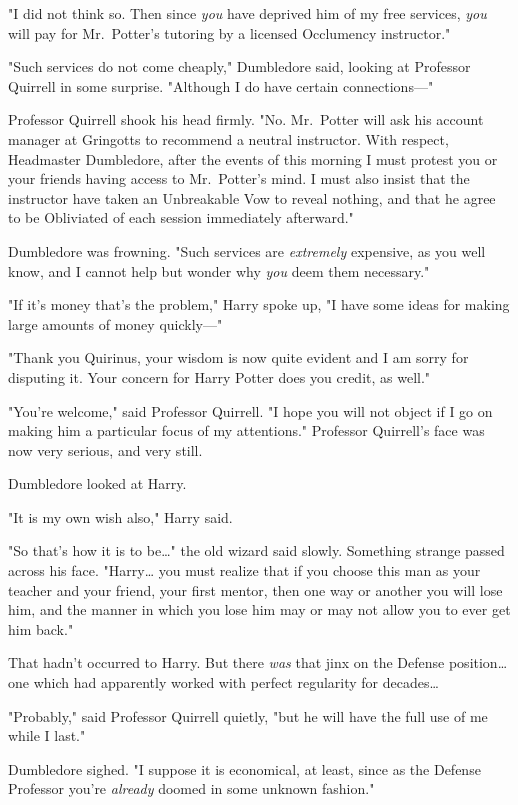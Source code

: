 "I did not think so. Then since \emph{you} have deprived him of my free 
services, \emph{you} will pay for Mr.~Potter's tutoring by a licensed 
Occlumency instructor."

"Such services do not come cheaply," Dumbledore said, looking at Professor 
Quirrell in some surprise. "Although I do have certain connections---"

Professor Quirrell shook his head firmly. "No. Mr.~Potter will ask his account 
manager at Gringotts to recommend a neutral instructor. With respect, 
Headmaster Dumbledore, after the events of this morning I must protest you or 
your friends having access to Mr.~Potter's mind. I must also insist that the 
instructor have taken an Unbreakable Vow to reveal nothing, and that he agree 
to be Obliviated of each session immediately afterward."

Dumbledore was frowning. "Such services are \emph{extremely} expensive, as you 
well know, and I cannot help but wonder why \emph{you} deem them necessary."

"If it's money that's the problem," Harry spoke up, "I have some ideas for 
making large amounts of money quickly---"

"Thank you Quirinus, your wisdom is now quite evident and I am sorry for 
disputing it. Your concern for Harry Potter does you credit, as well."

"You're welcome," said Professor Quirrell. "I hope you will not object if I go 
on making him a particular focus of my attentions." Professor Quirrell's face 
was now very serious, and very still.

Dumbledore looked at Harry.

"It is my own wish also," Harry said.

"So that's how it is to be{\ldots}" the old wizard said slowly. Something 
strange passed across his face. "Harry{\ldots} you must realize that if you 
choose this man as your teacher and your friend, your first mentor, then one 
way or another you will lose him, and the manner in which you lose him may or 
may not allow you to ever get him back."

That hadn't occurred to Harry. But there \emph{was} that jinx on the Defense 
position{\ldots} one which had apparently worked with perfect regularity for 
decades{\ldots}

"Probably," said Professor Quirrell quietly, "but he will have the full use of 
me while I last."

Dumbledore sighed. "I suppose it is economical, at least, since as the Defense 
Professor you're \emph{already} doomed in some unknown fashion."

